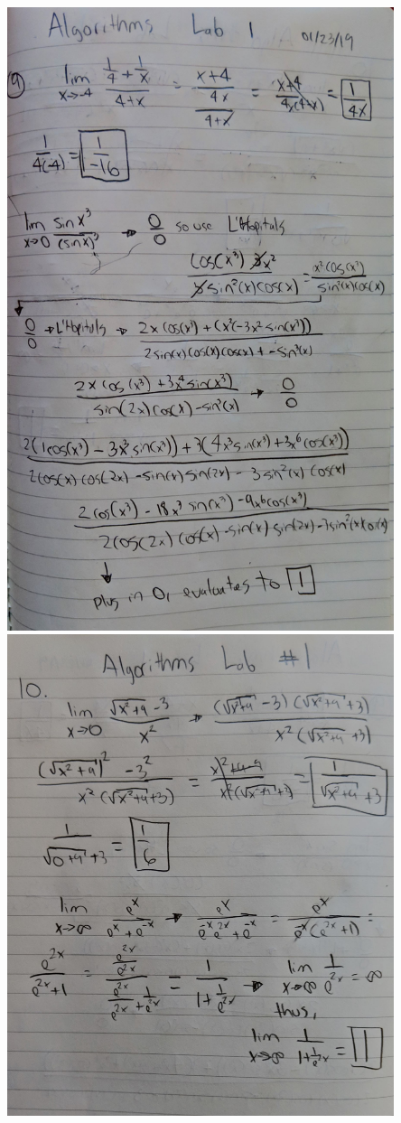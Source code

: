 \documentclass{article}
\begin{document}
\begin{enumerate}
	\includegraphics[width=0.85\textwidth]{9_small}\\
	\includegraphics[width=0.85\textwidth]{10_small}
\end{enumerate}
\end{document}
